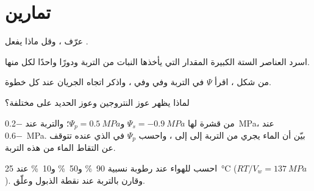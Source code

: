 \section{تمارين}

\begin{exercise}[$\star$]\label{exo:b1:plant-water-minerals:1}
عرّف  ، وقل ماذا يفعل .
\end{exercise}

\begin{exercise}[$\star$]\label{exo:b1:plant-water-minerals:2}
اسرد العناصر الستة الكبيرة المقدار التي يأخذها النبات من التربة
ودورًا واحدًا لكل منها.
\end{exercise}

\begin{exercise}[$\star$]\label{exo:b1:plant-water-minerals:3}
من شكل ، اقرأ $\Psi$ في التربة وفي   وفي 
، واذكر اتجاه الجريان عند كل خطوة.
\end{exercise}

\begin{exercise}[$\star$]\label{exo:b1:plant-water-minerals:4}
لماذا يظهر عوز النتروجين وعوز الحديد على  مختلفة؟
\end{exercise}

\begin{exercise}[$\star\star$]\label{exo:b1:plant-water-minerals:5}
 من قشرة  لها $\Psi_s = \qty{-0.9}{MPa}$ و$\Psi_p =
\qty{0.5}{MPa}$؛ والتربة عند \qty{-0.2}{MPa}،  عند
\qty{-0.6}{MPa}. بيّن أن الماء يجري من التربة إلى  إلى ،
واحسب $\Psi_p$ في  الذي عنده تتوقف عن التقاط الماء من هذه
التربة.
\end{exercise}

\begin{exercise}[$\star\star$]\label{exo:b1:plant-water-minerals:6}
احسب  للهواء عند رطوبة نسبية \qty{90}{\%}
و\qty{50}{\%} و\qty{10}{\%} عند \qty{25}{\celsius} ($RT/V_w =
\qty{137}{MPa}$). وقارن بالتربة عند نقطة الذبول وعلّق.
\end{exercise}

